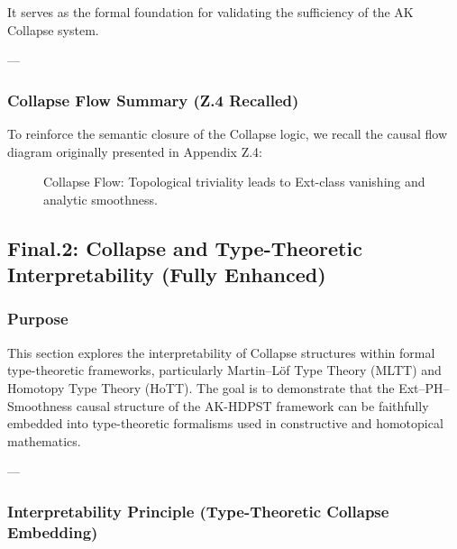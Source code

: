 \documentclass[11pt]{article}
\DeclareMathOperator{\colim}{colim}
\begin{document}
\begin{axiom}
\begin{axiom}
{{It serves as the formal foundation for validating the sufficiency of the AK Collapse system.

---

\subsubsection*{Collapse Flow Summary (Z.4 Recalled)}

To reinforce the semantic closure of the Collapse logic,  
we recall the causal flow diagram originally presented in Appendix Z.4:

\begin{figure}[H]
\centering
{}
\caption{Collapse Flow: Topological triviality leads to Ext-class vanishing and analytic smoothness.}
\end{figure}



\subsection*{Final.2: Collapse and Type-Theoretic Interpretability (Fully Enhanced)}

\subsubsection*{Purpose}

This section explores the interpretability of Collapse structures within formal type-theoretic frameworks,  
particularly Martin–Löf Type Theory (MLTT) and Homotopy Type Theory (HoTT).  
The goal is to demonstrate that the Ext–PH–Smoothness causal structure of the AK-HDPST framework  
can be faithfully embedded into type-theoretic formalisms used in constructive and homotopical mathematics.

---

\subsubsection*{Interpretability Principle (Type-Theoretic Collapse Embedding)}

}}
\end{axiom}
\end{axiom}
\end{document}
